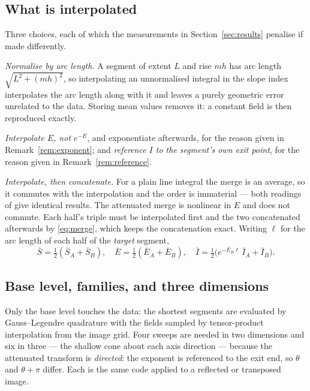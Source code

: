 \documentclass[11pt]{article}
\begin{document}
\subsection{What is interpolated}

Three choices, each of which the measurements in Section~\ref{sec:results}
penalise if made differently.

\emph{Normalise by arc length.} A segment of extent $L$ and rise $mh$ has arc
length $\sqrt{L^2 + (mh)^2}$, so interpolating an unnormalised integral in the
slope index interpolates the arc length along with it and leaves a purely
geometric error unrelated to the data. Storing mean values removes it: a
constant field is then reproduced exactly.

\emph{Interpolate $E$, not $e^{-E}$}, and exponentiate afterwards, for the
reason given in Remark~\ref{rem:exponent}; and \emph{reference $I$ to the
segment's own exit point}, for the reason given in
Remark~\ref{rem:reference}.

\emph{Interpolate, then concatenate.} For a plain line integral the merge is an
average, so it commutes with the interpolation and the order is immaterial ---
both readings of \citep{brandtdym1999} give identical results. The attenuated
merge is nonlinear in $E$ and does not commute. Each half's triple must be
interpolated first and the two concatenated afterwards by \eqref{eq:merge},
which keeps the concatenation exact. Writing $\ell$ for the arc length of each
half of the \emph{target} segment,
\begin{equation}
  \bar S = \tfrac12(\bar S_A + \bar S_B), \quad
  \bar E = \tfrac12(\bar E_A + \bar E_B), \quad
  \bar I = \tfrac12\big(e^{-\bar E_B \ell}\, \bar I_A + \bar I_B\big).
  \label{eq:merge_norm}
\end{equation}

\subsection{Base level, families, and three dimensions}

Only the base level touches the data: the shortest segments are evaluated by
Gauss--Legendre quadrature with the fields sampled by tensor-product
interpolation from the image grid. Four sweeps are needed in two dimensions and
six in three --- the shallow cone about each axis direction --- because the
attenuated transform is \emph{directed}: the exponent is referenced to the exit
end, so $\theta$ and $\theta + \pi$ differ. Each is the same code applied to a
reflected or transposed image.
\end{document}
